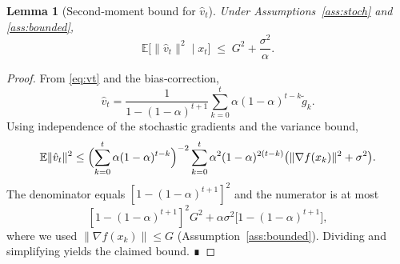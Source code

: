 \documentclass{article}
\newtheorem{lemma}{Lemma}[section]
\begin{document}
\begin{lemma}[Second‑moment bound for $\hat v_t$]\label{lem:second}
Under Assumptions~\ref{ass:stoch} and \ref{ass:bounded},
\[
\mathbb{E}\!\bigl[\|\hat v_t\|^2\mid x_t\bigr]
\;\le\;
G^{2}+\frac{\sigma^{2}}{\alpha}.
\]
\end{lemma}
\begin{proof}
From \eqref{eq:vt} and the bias‑correction,
\[
\hat v_t=\frac{1}{1-(1-\alpha)^{t+1}}
          \sum_{k=0}^{t}\alpha(1-\alpha)^{t-k}\tilde g_k .
\]
Using independence of the stochastic gradients and the variance bound,
\[
\mathbb{E}\|\hat v_t\|^{2}
\le
\Bigl(\sum_{k=0}^{t}\alpha(1-\alpha)^{t-k}\Bigr)^{-2}
\sum_{k=0}^{t}\alpha^{2}(1-\alpha)^{2(t-k)}
\bigl(\|\nabla f(x_k)\|^{2}+\sigma^{2}\bigr).
\]
The denominator equals $[1-(1-\alpha)^{t+1}]^{2}$ and the numerator is at most
\[
[1-(1-\alpha)^{t+1}]^{2}G^{2}+\alpha\sigma^{2}\bigl[1-(1-\alpha)^{t+1}\bigr],
\]
where we used $\|\nabla f(x_k)\|\le G$ (Assumption~\ref{ass:bounded}).
Dividing and simplifying yields the claimed bound. ∎
\end{proof}
\end{document}
